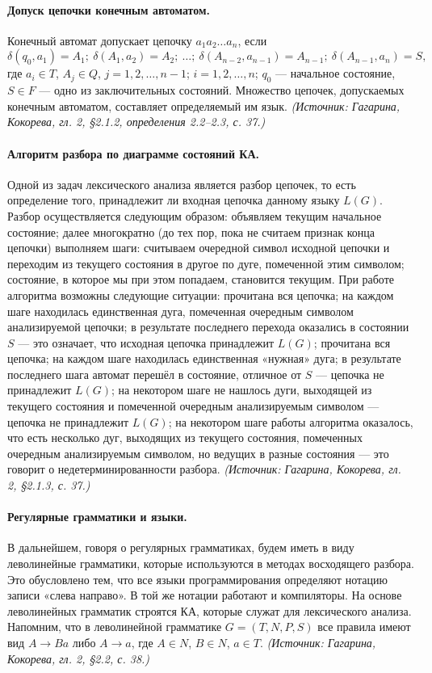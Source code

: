 \documentclass[a4paper,12pt]{article}
\begin{document}
\paragraph{Допуск цепочки конечным автоматом.}
Конечный автомат допускает цепочку \(a_1a_2\ldots a_n\), если
\[
\delta(q_0,a_1)=A_1;\ \delta(A_1,a_2)=A_2;\ \ldots;\ \delta(A_{n-2},a_{n-1})=A_{n-1};\ \delta(A_{n-1},a_n)=S,
\]
где \(a_i\in T\), \(A_j\in Q\), \(j=1,2,\ldots,n-1\); \(i=1,2,\ldots,n\); \(q_0\) — начальное состояние, \(S\in F\) — одно из заключительных состояний. Множество цепочек, допускаемых конечным автоматом, составляет определяемый им язык.
\textit{(Источник: Гагарина, Кокорева, гл. 2, §2.1.2, определения 2.2--2.3, с. 37.)}

\paragraph{Алгоритм разбора по диаграмме состояний КА.}
Одной из задач лексического анализа является разбор цепочек, то есть определение того, принадлежит ли входная цепочка данному языку \(L(G)\). Разбор осуществляется следующим образом: объявляем текущим начальное состояние; далее многократно (до тех пор, пока не считаем признак конца цепочки) выполняем шаги: считываем очередной символ исходной цепочки и переходим из текущего состояния в другое по дуге, помеченной этим символом; состояние, в которое мы при этом попадаем, становится текущим. При работе алгоритма возможны следующие ситуации: прочитана вся цепочка; на каждом шаге находилась единственная дуга, помеченная очередным символом анализируемой цепочки; в результате последнего перехода оказались в состоянии \(S\) — это означает, что исходная цепочка принадлежит \(L(G)\); прочитана вся цепочка; на каждом шаге находилась единственная «нужная» дуга; в результате последнего шага автомат перешёл в состояние, отличное от \(S\) — цепочка не принадлежит \(L(G)\); на некотором шаге не нашлось дуги, выходящей из текущего состояния и помеченной очередным анализируемым символом — цепочка не принадлежит \(L(G)\); на некотором шаге работы алгоритма оказалось, что есть несколько дуг, выходящих из текущего состояния, помеченных очередным анализируемым символом, но ведущих в разные состояния — это говорит о недетерминированности разбора.
\textit{(Источник: Гагарина, Кокорева, гл. 2, §2.1.3, с. 37.)}

\paragraph{Регулярные грамматики и языки.}
В дальнейшем, говоря о регулярных грамматиках, будем иметь в виду леволинейные грамматики, которые используются в методах восходящего разбора. Это обусловлено тем, что все языки программирования определяют нотацию записи «слева направо». В той же нотации работают и компиляторы. На основе леволинейных грамматик строятся КА, которые служат для лексического анализа. Напомним, что в леволинейной грамматике \(G=(T,N,P,S)\) все правила имеют вид \(A\to Ba\) либо \(A\to a\), где \(A\in N\), \(B\in N\), \(a\in T\).
\textit{(Источник: Гагарина, Кокорева, гл. 2, §2.2, с. 38.)}
\end{document}
